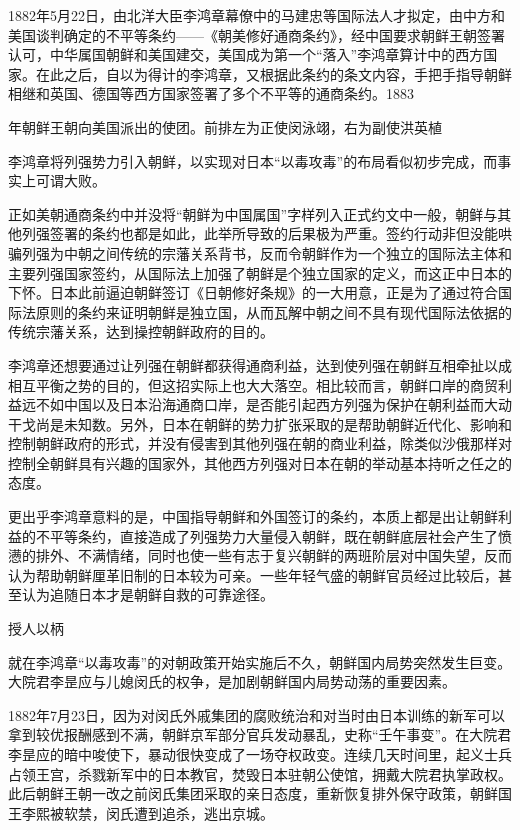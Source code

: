 \documentclass[12pt,UTF8]{ctexbook}
\begin{document}
1882年5月22日，由北洋大臣李鸿章幕僚中的马建忠等国际法人才拟定，由中方和美国谈判确定的不平等条约——《朝美修好通商条约》，经中国要求朝鲜王朝签署认可，中华属国朝鲜和美国建交，美国成为第一个“落入”李鸿章算计中的西方国家。在此之后，自以为得计的李鸿章，又根据此条约的条文内容，手把手指导朝鲜相继和英国、德国等西方国家签署了多个不平等的通商条约。1883


年朝鲜王朝向美国派出的使团。前排左为正使闵泳翊，右为副使洪英植

李鸿章将列强势力引入朝鲜，以实现对日本“以毒攻毒”的布局看似初步完成，而事实上可谓大败。

正如美朝通商条约中并没将“朝鲜为中国属国”字样列入正式约文中一般，朝鲜与其他列强签署的条约也都是如此，此举所导致的后果极为严重。签约行动非但没能哄骗列强为中朝之间传统的宗藩关系背书，反而令朝鲜作为一个独立的国际法主体和主要列强国家签约，从国际法上加强了朝鲜是个独立国家的定义，而这正中日本的下怀。日本此前逼迫朝鲜签订《日朝修好条规》的一大用意，正是为了通过符合国际法原则的条约来证明朝鲜是独立国，从而瓦解中朝之间不具有现代国际法依据的传统宗藩关系，达到操控朝鲜政府的目的。

李鸿章还想要通过让列强在朝鲜都获得通商利益，达到使列强在朝鲜互相牵扯以成相互平衡之势的目的，但这招实际上也大大落空。相比较而言，朝鲜口岸的商贸利益远不如中国以及日本沿海通商口岸，是否能引起西方列强为保护在朝利益而大动干戈尚是未知数。另外，日本在朝鲜的势力扩张采取的是帮助朝鲜近代化、影响和控制朝鲜政府的形式，并没有侵害到其他列强在朝的商业利益，除类似沙俄那样对控制全朝鲜具有兴趣的国家外，其他西方列强对日本在朝的举动基本持听之任之的态度。

更出乎李鸿章意料的是，中国指导朝鲜和外国签订的条约，本质上都是出让朝鲜利益的不平等条约，直接造成了列强势力大量侵入朝鲜，既在朝鲜底层社会产生了愤懑的排外、不满情绪，同时也使一些有志于复兴朝鲜的两班阶层对中国失望，反而认为帮助朝鲜厘革旧制的日本较为可亲。一些年轻气盛的朝鲜官员经过比较后，甚至认为追随日本才是朝鲜自救的可靠途径。

授人以柄

就在李鸿章“以毒攻毒”的对朝政策开始实施后不久，朝鲜国内局势突然发生巨变。大院君李昰应与儿媳闵氏的权争，是加剧朝鲜国内局势动荡的重要因素。

1882年7月23日，因为对闵氏外戚集团的腐败统治和对当时由日本训练的新军可以拿到较优报酬感到不满，朝鲜京军部分官兵发动暴乱，史称“壬午事变”。在大院君李昰应的暗中唆使下，暴动很快变成了一场夺权政变。连续几天时间里，起义士兵占领王宫，杀戮新军中的日本教官，焚毁日本驻朝公使馆，拥戴大院君执掌政权。此后朝鲜王朝一改之前闵氏集团采取的亲日态度，重新恢复排外保守政策，朝鲜国王李熙被软禁，闵氏遭到追杀，逃出京城。
\end{document}
